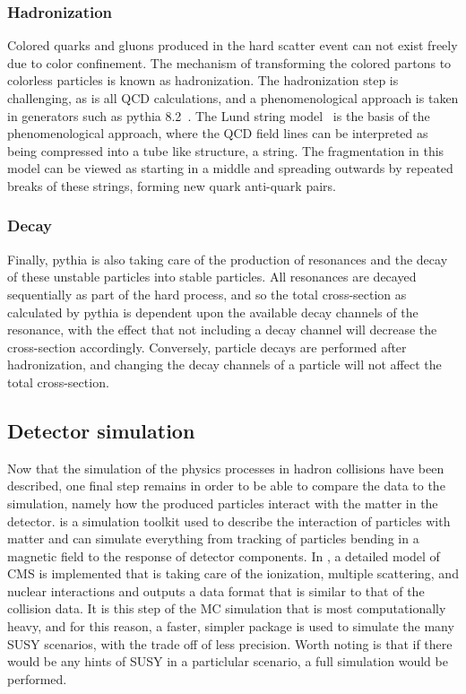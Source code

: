 \subsubsection*{Hadronization}
\noindent
\justify
Colored quarks and gluons produced in the hard scatter event can not exist freely due to color confinement. 
The mechanism of transforming the colored partons to colorless particles is known as hadronization. 
The hadronization step is challenging, as is all QCD calculations, and a phenomenological approach is taken in generators such as {\sc pythia} 8.2~\cite{Sjostrand:2014zea}.
The Lund string model~\cite{Andersson:1983ia} is the basis of the phenomenological approach, where the QCD field lines can be interpreted as being compressed into a tube like structure, a string. 
The fragmentation in this model can be viewed as starting in a middle and spreading outwards by repeated breaks of these strings, forming new quark anti-quark pairs. 
\subsubsection*{Decay}
\noindent
\justify
Finally, {\sc pythia} is also taking care of the production of resonances and the decay of these unstable particles into stable particles.  
All resonances are decayed sequentially as part of the hard process, and so the total cross-section as calculated by {\sc pythia} is dependent upon the available decay channels of the resonance, with the effect that not including a decay channel will decrease the cross-section accordingly. 
Conversely, particle decays are performed after hadronization, and changing the decay channels of a particle will not affect the total cross-section.  
\subsection*{Detector simulation}
\noindent
\justify
Now that the simulation of the physics processes in hadron collisions have been described, one final step remains in order to be able to compare the data to the simulation, namely how the produced particles interact with the matter in the detector. 
\GEANTfour \cite{Agostinelli:2002hh} is a simulation toolkit used to describe the interaction of particles with matter and can simulate everything from tracking of particles bending in a magnetic field to the response of detector components. 
In \GEANTfour, a detailed model of CMS is implemented that is taking care of the ionization, multiple scattering, and nuclear interactions and outputs a data format that is similar to that of the collision data. 
It is this step of the MC simulation that is most computationally heavy, and for this reason, a faster, simpler package is used to simulate the many SUSY scenarios, with the trade off of less precision. 
Worth noting is that if there would be any hints of SUSY in a particlular scenario, a full simulation would be performed.
